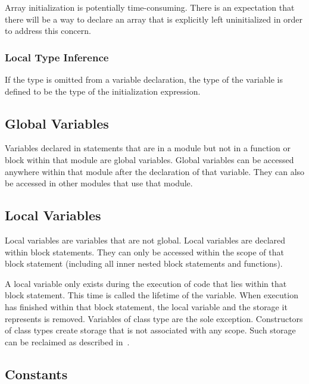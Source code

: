 \begin{openissue}
Array initialization is potentially time-consuming.  There is an
expectation that there will be a way to declare an array that is
explicitly left uninitialized in order to address this concern.
\end{openissue}

\subsubsection{Local Type Inference}
\label{Local_Type_Inference}

If the type is omitted from a variable declaration, the type of the
variable is defined to be the type of the initialization expression.

\subsection{Global Variables}
\label{Global_Variables}

Variables declared in statements that are in a module but not in a
function or block within that module are global variables.  Global
variables can be accessed anywhere within that module after the
declaration of that variable.  They can also be accessed in other
modules that use that module.

\subsection{Local Variables}
\label{Local_Variables}

Local variables are variables that are not global.  Local variables
are declared within block statements.  They can only be accessed
within the scope of that block statement (including all inner nested
block statements and functions).

A local variable only exists during the execution of code that lies
within that block statement.  This time is called the lifetime of the
variable.  When execution has finished within that block statement,
the local variable and the storage it represents is removed.
Variables of class type are the sole exception.  Constructors of class
types create storage that is not associated with any scope.  Such
storage can be reclaimed as described
in~.

\subsection{Constants}
\label{Constants}

